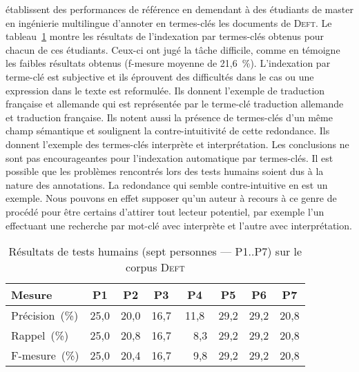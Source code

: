      établissent des performances de référence en
    demendant à des étudiants de master en ingénierie multilingue d'annoter en
    termes-clés les documents de \textsc{Deft}. Le
    tableau~\ref{tab:deft_human_tests} montre les résultats de l'indexation par
    termes-clés obtenus pour chacun de ces étudiants. Ceux-ci ont jugé la tâche
    difficile, comme en témoigne les faibles résultats obtenus (f-mesure moyenne
    de 21,6~\%). L'indexation par terme-clé est subjective et ils éprouvent des
    difficultés dans le cas ou une expression dans le texte est reformulée. Ils
    donnent l'exemple de \og{}traduction française et allemande\fg{} qui est
    représentée par le terme-clé \og{}traduction allemande et traduction
    française\fg{}. Ils notent aussi la présence de termes-clés d'un même champ
    sémantique et soulignent la contre-intuitivité de cette redondance. Ils
    donnent l'exemple des termes-clés \og{}interprète\fg{} et
    \og{}interprétation\fg{}. Les conclusions ne sont pas encourageantes pour
    l'indexation automatique par termes-clés. Il est possible que les problèmes
    rencontrés lors des tests humains soient dus à la nature des annotations. La
    redondance qui semble contre-intuitive en est un exemple. Nous pouvons en
    effet supposer qu'un auteur à recours à ce genre de procédé pour être
    certains d'attirer tout lecteur potentiel, par exemple l'un effectuant une
    recherche par mot-clé avec \og{}interprète\fg{} et l'autre avec
    \og{}interprétation\fg{}.
    \begin{table}[!h]
      \centering
      \begin{tabular}{l|ccccccc}
        \toprule
          \textbf{Mesure} & \textbf{P1} & \textbf{P2} & \textbf{P3} & \textbf{P4} & \textbf{P5} & \textbf{P6} & \textbf{P7}\\
        \hline
        Précision~\hfill(\%) & 25,0 & 20,0 & 16,7 & 11,8 & 29,2 & 29,2 & 20,8\\
        Rappel~\hfill(\%) & 25,0 & 20,8 & 16,7 & ~~8,3 & 29,2 & 29,2 & 20,8\\
        F-mesure~\hfill(\%) & 25,0 & 20,4 & 16,7 & ~~9,8 & 29,2 & 29,2 & 20,8\\
        \bottomrule
      \end{tabular}
      \caption[Résultats de tests humains sur le corpus \textsc{Deft}]{
        Résultats de tests humains (sept personnes --- P1$..$P7) sur le corpus
        \textsc{Deft}
        \label{tab:deft_human_tests}
      }
    \end{table}

